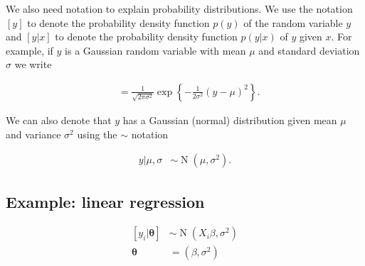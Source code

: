 \documentclass[]{book}
\begin{document}
We also need notation to explain probability distributions. We use the notation \([y]\) to denote the probability density function \(p(y)\) of the random variable \(y\) and \([y|x]\) to denote the probability density function \(p(y|x)\) of \(y\) given \(x\). For example, if \(y\) is a Gaussian random variable with mean \(\mu\) and standard deviation \(\sigma\) we write

\begin{align*}
[y | \mu, \sigma] & = \frac{1}{\sqrt{2 \pi \sigma^2}} \exp \left\{-\frac{1}{2 \sigma^2} (y - \mu)^2 \right\}.
\end{align*}

We can also denote that \(y\) has a Gaussian (normal) distribution given mean \(\mu\) and variance \(\sigma^2\) using the \(\sim\) notation

\begin{align*}
y | \mu, \sigma & \sim \operatorname{N}(\mu, \sigma^2).
\end{align*}

\hypertarget{example-linear-regression}{%
\subsection{Example: linear regression}\label{example-linear-regression}}

\begin{align*}
\left[y_i | \boldsymbol{\theta} \right] & \sim \operatorname{N}(X_i \beta, \sigma^2) \\
\boldsymbol{\theta} & = (\beta, \sigma^2)
\end{align*}
\end{document}
